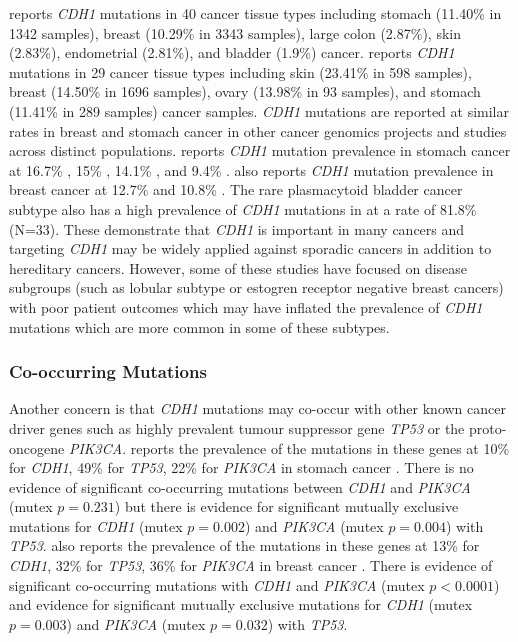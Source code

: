 \citet{COSMICdb} reports \textit{CDH1} mutations in 40 cancer tissue types including stomach (11.40\% in 1342 samples), breast (10.29\% in 3343 samples), large colon (2.87\%), skin (2.83\%), endometrial (2.81\%), and bladder (1.9\%) cancer. \citet{ICGC2017web} reports \textit{CDH1} mutations in 29 cancer tissue types including skin (23.41\% in 598 samples), breast (14.50\% in 1696 samples), ovary (13.98\% in 93 samples), and stomach (11.41\% in 289 samples) cancer samples. \textit{CDH1} mutations are reported at similar rates in breast and stomach cancer in other cancer \gls{genomics} projects and studies across distinct populations. \citet{cBioPortal} reports \textit{CDH1} mutation prevalence in stomach cancer at 16.7\% \citep[30 samples]{Kakiuchi2014}, 15\% \citep[100 samples]{Wang2014}, 14.1\% \citep[78 samples]{Chen2015}, and 9.4\% \citep[393 samples]{TCGA2017prov}. \citet{cBioPortal} also reports \textit{CDH1} mutation prevalence in breast cancer at 12.7\% \citep[963 samples]{TCGA2017prov} and 10.8\% \citep[2051 samples]{METABRIC2012, METABRIC2016}. The rare plasmacytoid bladder cancer subtype also has a high prevalence of \textit{CDH1} mutations in \citet{COSMICdb} at a rate of 81.8\% (N=33). These demonstrate that \textit{CDH1} is important in many cancers and targeting \textit{CDH1} may be widely applied against sporadic cancers in addition to hereditary cancers. However, some of these studies have focused on disease subgroups (such as lobular subtype or estogren receptor negative breast cancers) with poor patient outcomes which may have inflated the prevalence of \textit{CDH1} mutations which are more common in some of these subtypes.

\subsubsection{Co-occurring Mutations}

Another concern is that \textit{CDH1} mutations may co-occur with other known cancer driver genes such as highly prevalent tumour suppressor gene \textit{\textit{TP53}} or the proto-oncogene \textit{\textit{PIK3CA}}. \citet{cBioPortal} reports the prevalence of the mutations in these genes at 10\% for \textit{CDH1}, 49\% for \textit{\textit{TP53}}, 22\% for \textit{\textit{PIK3CA}} in stomach cancer \citep[393 samples]{TCGA2017prov}. There is no evidence of significant co-occurring mutations between \textit{CDH1} and \textit{\textit{PIK3CA}} (mutex $p=0.231$) but there is evidence for significant mutually exclusive mutations for \textit{CDH1} (mutex $p=0.002$) and \textit{\textit{PIK3CA}} (mutex $p=0.004$) with \textit{\textit{TP53}}. \citet{cBioPortal} also reports the prevalence of the mutations in these genes at 13\% for \textit{CDH1}, 32\% for \textit{\textit{TP53}}, 36\% for \textit{\textit{PIK3CA}} in breast cancer \citep[963 samples]{TCGA2017prov}. There is evidence of significant co-occurring mutations with \textit{CDH1} and \textit{\textit{PIK3CA}} (mutex $p<0.0001$) and evidence for significant mutually exclusive mutations for \textit{CDH1} (mutex $p=0.003$) and \textit{\textit{PIK3CA}} (mutex $p=0.032$) with \textit{\textit{TP53}}.

